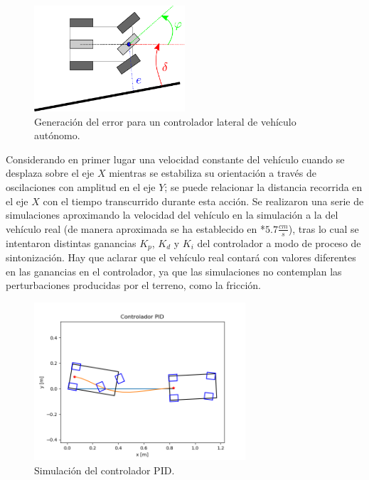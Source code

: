 \begin{figure}[htbp!]
	\centering
	\includegraphics[width=0.5\textwidth]{./Figuras/Lane}
	\caption{Generación del error para un controlador lateral de vehículo autónomo.}
	\label{fig:lane}
\end{figure}
\par Considerando en primer lugar una velocidad constante del vehículo cuando se desplaza sobre el eje $X$ mientras se estabiliza su orientación a través de oscilaciones con amplitud en el eje $Y$; se puede relacionar la distancia recorrida en el eje $X$ con el tiempo transcurrido durante esta acción. Se realizaron una serie de simulaciones aproximando la velocidad del vehículo en la simulación a la del vehículo real (de manera aproximada se ha establecido en *$5.7 \frac{cm}{s}$), tras lo cual se intentaron distintas ganancias $K_{p}$, $K_{d}$ y $K_{i}$ del controlador a modo de proceso de sintonización. Hay que aclarar que el vehículo real contará con valores diferentes en las ganancias en el controlador, ya que las simulaciones no contemplan las perturbaciones producidas por el terreno, como la fricción.
\begin{figure}[htbp!]
	\centering
	\includegraphics[width=0.7\textwidth]{./Figuras/PIDSim}
	\caption{Simulación del controlador PID.}
	\label{fig:pids}
\end{figure}
